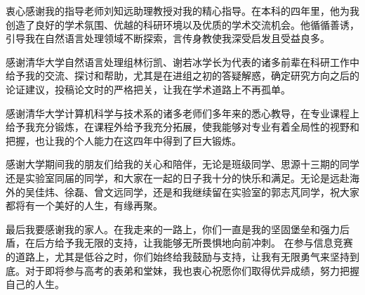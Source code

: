 \begin{acknowledgement}

衷心感谢我的指导老师刘知远助理教授对我的精心指导。在本科的四年里，他为我创造了良好的学术氛围、优越的科研环境以及优质的学术交流机会。他循循善诱，引导我在自然语言处理领域不断探索，言传身教使我深受启发且受益良多。

感谢清华大学自然语言处理组林衍凯、谢若冰学长为代表的诸多前辈在科研工作中给予我的交流、探讨和帮助，尤其是在进组之初的答疑解惑，确定研究方向之后的论证建议，投稿论文时的严格把关，让我在学术道路上不再孤单。

感谢清华大学计算机科学与技术系的诸多老师们多年来的悉心教导，在专业课程上给予我充分锻炼，在课程外给予我充分拓展，使我能够对专业有着全局性的视野和把握，也让我的个人能力在这四年中得到了巨大锻炼。

感谢大学期间我的朋友们给我的关心和陪伴，无论是班级同学、思源十三期的同学还是实验室同届的同学，和大家在一起的日子我十分的快乐和满足。无论是远赴海外的吴佳炜、徐磊、曾文远同学，还是和我继续留在实验室的郭志芃同学，祝大家都将有一个美好的人生，有缘再聚。

最后我要感谢我的家人。在我走来的一路上，你们一直是我的坚固堡垒和强力后盾，在后方给予我无限的支持，让我能够无所畏惧地向前冲刺。
在参与信息竞赛的道路上，尤其是低谷之时，你们始终给我鼓励与支持，让我有无限勇气来坚持到底。对于即将参与高考的表弟和堂妹，我也衷心祝愿你们取得优异成绩，努力把握自己的人生。

\end{acknowledgement}


